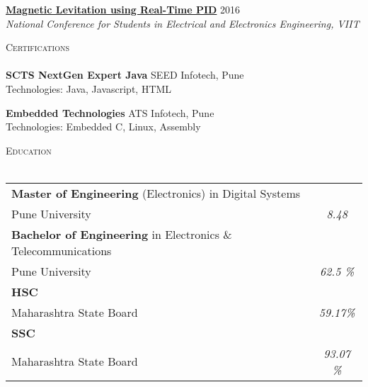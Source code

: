 \documentclass[a4paper]{article}
\newcommand{\lineunder} {
    \vspace*{-8pt} \\
    \hspace*{-18pt} \hrulefill \\
}
\newcommand{\header} [1] {
    {\hspace*{-18pt}\vspace*{6pt} \textsc{#1}}
    \vspace*{-6pt} \lineunder
}
\begin{document}
{\textbf{\href{https://ijrat.org/downloads/Conference_Proceedings/ncseee2016/ncseee-15.pdf}{Magnetic Levitation using Real-Time PID}}} \hfill 2016\\
\textit{National Conference for Students in Electrical and Electronics Engineering, VIIT} \\
\vspace*{2mm}

\header{Certifications}
\vspace{1mm}
\textbf{SCTS NextGen Expert Java} \hfill SEED Infotech, Pune\\
Technologies: Java, Javascript, HTML\\
\vspace*{2mm}

\textbf{Embedded Technologies} \hfill ATS Infotech, Pune\\
Technologies: Embedded C, Linux, Assembly\\
\vspace*{2mm}

\header{Education}
\vspace{1mm}
\bgroup
\def\arraystretch{1.2}
\begin{tabularx}{\textwidth}{ | X | c | }
  \hline

\textbf{Master of Engineering} (Electronics) in Digital Systems & \\
Pune University & \textit{8.48} \\
  \hline

\textbf{Bachelor of Engineering} in Electronics \& Telecommunications & \\
Pune University & \textit{62.5 \%} \\
  \hline

\textbf{HSC} &\\
Maharashtra State Board & \textit{59.17\%}  \\
  \hline

  \textbf{SSC} & \\
Maharashtra State Board & \textit{93.07 \%} \\
  \hline

\end{tabularx}
\egroup
\vspace{2mm}
\end{document}
